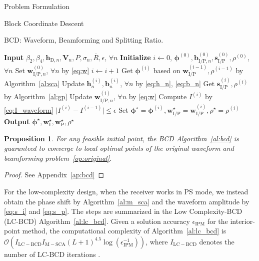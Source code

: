 \documentclass[journal]{IEEEtran}
\newtheorem{proposition}{Proposition}
\begin{document}
\begin{section}{Problem Formulation}
\begin{subsection}{Block Coordinate Descent}
			\begin{algorithm}[!t]
				\caption{BCD: Waveform, Beamforming and Splitting Ratio.}
				\label{al:bcd}
				\begin{algorithmic}[1]
					\State \textbf{Input} $\beta_2,\beta_4,\boldsymbol{h}_{\mathrm{D},n},\boldsymbol{V}_{n},P,\sigma_n,\bar{R},\epsilon$, $\forall n$
					\State \textbf{Initialize} $i \gets 0$, $\boldsymbol{\phi}^{(0)},\boldsymbol{b}_{\mathrm{I/P},n}^{(0)},\boldsymbol{s}_{\mathrm{I/P}}^{(0)},\rho^{(0)}$, $\forall n$
					\State Set $\boldsymbol{w}_{\mathrm{I/P},n}^{(0)}$, $\forall n$ by \eqref{eq:w}
					\Repeat
						\State $i \gets i + 1$
						\State Get $\boldsymbol{\phi}^{(i)}$ based on $\boldsymbol{w}_{\mathrm{I/P}}^{(i-1)},\rho^{(i-1)}$ by Algorithm~\ref{al:sca}
						\State Update $\boldsymbol{h}_n^{(i)},\boldsymbol{b}_n^{(i)}$, $\forall n$ by \eqref{eq:h_n}, \eqref{eq:b_n}
						\State Get $\boldsymbol{s}_{\mathrm{I/P}}^{(i)},\rho^{(i)}$ by Algorithm~\ref{al:gp}
						\State Update $\boldsymbol{w}_{\mathrm{I/P},n}^{(i)}$, $\forall n$ by \eqref{eq:w}
						\State Compute $I^{(i)}$ by \eqref{eq:I_waveform}
					\Until $\lvert I^{(i)} - I^{(i-1)} \rvert \le \epsilon$
					\State Set $\boldsymbol{\phi}^{\star}=\boldsymbol{\phi}^{(i)},\boldsymbol{w}_{\mathrm{I/P}}^{\star}=\boldsymbol{w}_{\mathrm{I/P}}^{(i)},\rho^{\star}=\rho^{(i)}$
					\State \textbf{Output} $\boldsymbol{\phi}^{\star},\boldsymbol{w}_{\mathrm{I}}^{\star},\boldsymbol{w}_{\mathrm{P}}^{\star},\rho^{\star}$
				\end{algorithmic}
			\end{algorithm}

			\begin{proposition}\label{pr:bcd}
				For any feasible initial point, the BCD Algorithm~\ref{al:bcd} is guaranteed to converge to local optimal points of the original waveform and beamforming problem~\eqref{op:original}.
			\end{proposition}

			\begin{proof}\label{pf:bcd}
				See Appendix~\ref{ap:bcd}
			\end{proof}

			For the low-complexity design, when the receiver works in PS mode, we instead obtain the phase shift by Algorithm~\ref{al:m_sca} and the waveform amplitude by \eqref{eq:s_i} and \eqref{eq:s_p}. The steps are summarized in the Low Complexity-BCD (LC-BCD) Algorithm~\ref{al:lc_bcd}. Given a solution accuracy $\epsilon_{\mathrm{IPM}}$ for the interior-point method, the computational complexity of Algorithm~\ref{al:lc_bcd} is $\mathcal{O}\left(I_{\mathrm{LC-BCD}}I_{\mathrm{M-SCA}}(L+1)^{4.5} \log(\epsilon_{\mathrm{IPM}}^{-1})\right)$, where $I_{\mathrm{LC-BCD}}$ denotes the number of LC-BCD iterations \cite{Luo2010}.


\end{subsection}
\end{section}
\end{document}
